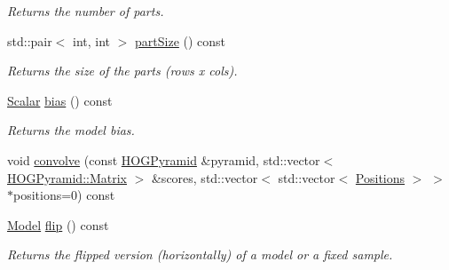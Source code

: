 \begin{DoxyCompactItemize}
\begin{DoxyCompactList}\small\item\em Returns the number of parts. \end{DoxyCompactList}\item 
\hypertarget{class_f_f_l_d_1_1_model_a37f7d8396c5a841209cf0cb4e69d0157}{std\-::pair$<$ int, int $>$ \hyperlink{class_f_f_l_d_1_1_model_a37f7d8396c5a841209cf0cb4e69d0157}{part\-Size} () const }\label{class_f_f_l_d_1_1_model_a37f7d8396c5a841209cf0cb4e69d0157}

\begin{DoxyCompactList}\small\item\em Returns the size of the parts ({\ttfamily rows x cols}). \end{DoxyCompactList}\item 
\hypertarget{class_f_f_l_d_1_1_model_a2f391b6981fa65a2eaa6a379a47c0519}{\hyperlink{class_f_f_l_d_1_1_model_a81cb0b1b5689c8d28af13eb18811b52a}{Scalar} \hyperlink{class_f_f_l_d_1_1_model_a2f391b6981fa65a2eaa6a379a47c0519}{bias} () const }\label{class_f_f_l_d_1_1_model_a2f391b6981fa65a2eaa6a379a47c0519}

\begin{DoxyCompactList}\small\item\em Returns the model bias. \end{DoxyCompactList}\item 
void \hyperlink{class_f_f_l_d_1_1_model_a9a70229e2e34132acf97de0de1e6ee81}{convolve} (const \hyperlink{class_f_f_l_d_1_1_h_o_g_pyramid}{H\-O\-G\-Pyramid} \&pyramid, std\-::vector$<$ \hyperlink{class_f_f_l_d_1_1_h_o_g_pyramid_a2618b4bd5d17f05cdc108189ed5abe3a}{H\-O\-G\-Pyramid\-::\-Matrix} $>$ \&scores, std\-::vector$<$ std\-::vector$<$ \hyperlink{class_f_f_l_d_1_1_model_ac0493e10c6cde7f65bd6244fdb679ea3}{Positions} $>$ $>$ $\ast$positions=0) const 
\item 
\hypertarget{class_f_f_l_d_1_1_model_a65ee168347bf626fbf3ad90823a2159c}{\hyperlink{class_f_f_l_d_1_1_model}{Model} \hyperlink{class_f_f_l_d_1_1_model_a65ee168347bf626fbf3ad90823a2159c}{flip} () const }\label{class_f_f_l_d_1_1_model_a65ee168347bf626fbf3ad90823a2159c}

\begin{DoxyCompactList}\small\item\em Returns the flipped version (horizontally) of a model or a fixed sample. \end{DoxyCompactList}\end{DoxyCompactItemize}

